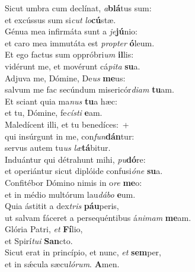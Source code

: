 \evenverse Sicut umbra cum declínat, \textit{a}\textbf{blá}tus sum:~\*\\
\evenverse et excússus sum si\textit{cut} \textit{lo}\textbf{cú}stæ.\\
\oddverse Génua mea infirmáta sunt a \textit{je}\textbf{jú}nio:~\*\\
\oddverse et caro mea immutáta est \textit{prop}\textit{ter} \textbf{ó}leum.\\
\evenverse Et ego factus sum oppróbri\textit{um} \textbf{il}lis:~\*\\
\evenverse vidérunt me, et movérunt cá\textit{pi}\textit{ta} \textbf{su}a.\\
\oddverse Adjuva me, Dómine, De\textit{us} \textbf{me}us:~\*\\
\oddverse salvum me fac secúndum misericór\textit{di}\textit{am} \textbf{tu}am.\\
\evenverse Et sciant quia ma\textit{nus} \textbf{tu}a hæc:~\*\\
\evenverse et tu, Dómine, fe\textit{cí}\textit{sti} \textbf{e}am.\\
\oddverse Maledícent illi, et tu benedíces:~+\\
\oddverse  qui insúrgunt in me, con\textit{fun}\textbf{dán}tur:~\*\\
\oddverse servus autem tu\textit{us} \textit{læ}\textbf{tá}bitur.\\
\evenverse Induántur qui détrahunt mihi, \textit{pu}\textbf{dó}re:~\*\\
\evenverse et operiántur sicut diplóide confusi\textit{ó}\textit{ne} \textbf{su}a.\\
\oddverse Confitébor Dómino nimis in o\textit{re} \textbf{me}o:~\*\\
\oddverse et in médio multórum lau\textit{dá}\textit{bo} \textbf{e}um.\\
\evenverse Quia ástitit a dex\textit{tris} \textbf{páu}peris,~\*\\
\evenverse ut salvam fáceret a persequéntibus á\textit{ni}\textit{mam} \textbf{me}am.\\
\oddverse Glória Patri, \textit{et} \textbf{Fí}lio,~\*\\
\oddverse et Spirí\textit{tu}\textit{i} \textbf{San}cto.\\
\evenverse Sicut erat in princípio, et nunc, \textit{et} \textbf{sem}per,~\*\\
\evenverse et in sǽcula sæcu\textit{ló}\textit{rum}. \textbf{A}men.\\
